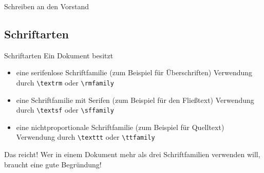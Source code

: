 \begin{frame}[t]{Schreiben an den Vorstand}
\end{frame}

\subsection{Schriftarten}

\begin{Frame}[fragile]{Schriftarten}
  Ein Dokument besitzt
  \begin{itemize}
    \item eine serifenlose Schriftfamilie\newline
      (zum Beispiel für Überschriften)\newline
      Verwendung durch \lstinline-\textrm- oder \lstinline-\rmfamily-
    \item eine Schriftfamilie mit Serifen\newline
      (zum Beispiel für den Fließtext)\newline
      Verwendung durch \lstinline-\textsf- oder \lstinline-\sffamily-
    \item eine nichtproportionale Schriftfamilie\newline
      (zum Beispiel für Quelltext)\newline
      Verwendung durch \lstinline-\texttt- oder \lstinline-\ttfamily-
  \end{itemize}

  \begin{alertblock}{Das reicht!}
    Wer in einem Dokument \alert{mehr als drei Schriftfamilien} verwenden will,
    braucht eine \alert{gute Begründung}!
  \end{alertblock}
\end{Frame}


